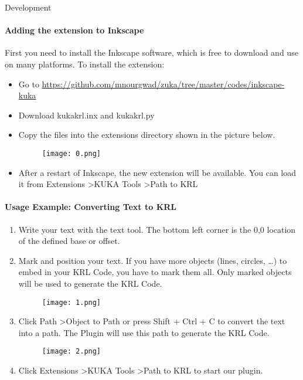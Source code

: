 \documentclass[a4paper]{book}
\begin{document}
\begin{chapter}{Development}
\paragraph{Adding the extension to Inkscape}
First you need to install the Inkscape software, which is free to download and use on many platforms.
To install the extension:
\begin{itemize}
	\item Go to \url{https://github.com/mnourgwad/zuka/tree/master/codes/inkscape-kuka}
	\item Download kukakrl.inx and kukakrl.py
	\item Copy the files into the extensions directory shown in the picture below.\
	\begin{figure}[H]
		\centering
		\texttt{[image: 0.png]}
	\end{figure}
\item After a restart of Inkscape, the new extension will be available.
You can load it from Extensions \textgreater KUKA Tools \textgreater Path to KRL

\end{itemize}
\paragraph{Usage Example: Converting Text to KRL}
	
\begin{enumerate}
	\item Write your text with the text tool. The bottom left corner is the 0,0 location of the defined base or offset.
	\item Mark and position your text. If you have more objects (lines, circles, …) to embed in your KRL Code, you have to mark them all. Only marked objects will be used to generate the KRL Code.
		\begin{figure}[H]
		\centering
		\texttt{[image: 1.png]}
	\end{figure}
	\item Click Path \textgreater Object to Path or press Shift + Ctrl + C to convert the text into a path. The Plugin will use this path to generate the KRL Code.
	\begin{figure}[H]
		\centering
		\texttt{[image: 2.png]}
	\end{figure}
	\item Click Extensions \textgreater KUKA Tools \textgreater Path to KRL to start our plugin.
	

\end{enumerate}
\end{chapter}
\end{document}
